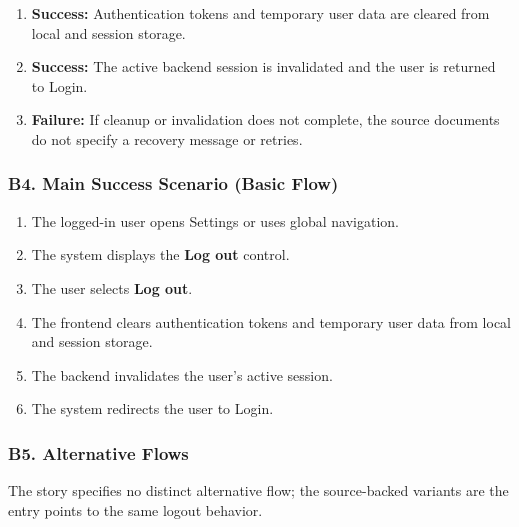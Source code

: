 \documentclass[12pt]{article}
\begin{document}
\begin{enumerate}
\item \textbf{Success:} Authentication tokens and temporary user data are cleared from local and session storage.
\item \textbf{Success:} The active backend session is invalidated and the user is returned to Login.
\item \textbf{Failure:} If cleanup or invalidation does not complete, the source documents do not specify a recovery message or retries.
\end{enumerate}
\par\medskip

\hypertarget{sec:b4-main-success-scenario-basic-flow}{}
\subsubsection*{B4. Main Success Scenario (Basic Flow)}
\par\medskip

\begin{enumerate}
\item The logged-in user opens Settings or uses global navigation.
\item The system displays the \textbf{Log out} control.
\item The user selects \textbf{Log out}.
\item The frontend clears authentication tokens and temporary user data from local and session storage.
\item The backend invalidates the user's active session.
\item The system redirects the user to Login.
\end{enumerate}
\par\medskip

\hypertarget{sec:b5-alternative-flows}{}
\subsubsection*{B5. Alternative Flows}
\par\medskip

The story specifies no distinct alternative flow; the source-backed variants are the entry points to the same logout behavior.
\par\medskip

\hypertarget{sec:a1-logout-from-settings}{}
\end{document}
